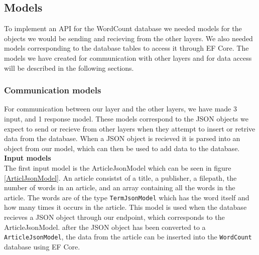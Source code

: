 \subsection{Models}
To implement an API for the WordCount database we needed models for the objects we would be sending and recieving from the other layers. We also needed models corresponding to the database tables to access it through EF Core. The models we have created for communication with other layers and for data access will be described in the following sections.

\subsubsection*{Communication models}
For communication between our layer and the other layers, we have made 3 input, and 1 response model. These models correspond to the JSON objects we expect to send or recieve from other layers when they attempt to insert or retrive data from the database. When a JSON object is recieved it is parsed into an object from our model, which can then be used to add data to the database.
\\

\textbf{Input models}\\
The first input model is the ArticleJsonModel which can be seen in figure \ref{ArticlJsonModel}. An article consistst of a title, a publisher, a filepath, the number of words in an article, and an array containing all the words in the article. The words are of the type \texttt{TermJsonModel} which has the word itself and how many times it occurs in the article.
This model is used when the database recieves a JSON object through our endpoint, which corresponds to the ArticleJsonModel. after the JSON object has been converted to a \texttt{ArticleJsonModel}, the data from the article can be inserted into the \texttt{WordCount} database using EF Core.

